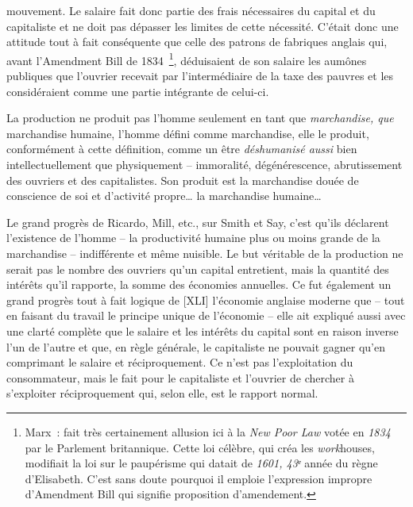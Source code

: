 \documentclass[french,twoside]{book} %
\begin{document}
mouvement. Le salaire fait donc partie des frais nécessaires du capital et du capitaliste et ne doit pas dépasser les limites de cette nécessité. C’était donc une attitude tout à fait conséquente que celle des patrons de fabriques anglais qui, avant l’Amendment Bill de 1834 \footnote{Marx : fait très certainement allusion ici à la \emph{New Poor Law} votée en \emph{1834} par le Parlement britannique. Cette loi célèbre, qui créa les \emph{work}houses, modifiait la loi sur le paupérisme qui datait de \emph{1601, 43ᵉ} année du règne d’Elisabeth. C’est sans doute pourquoi il emploie l’expression impropre d’Amendment Bill qui signifie proposition d’amendement.}, déduisaient de son salaire les aumônes publiques que l’ouvrier recevait par l’intermédiaire de la taxe des pauvres et les considéraient comme une partie intégrante de celui-ci.\par
La production ne produit pas l’homme seulement en tant que \emph{marchandise, que} marchandise humaine, l’homme défini comme marchandise, elle le produit, conformément à cette définition, comme un être \emph{déshumanisé aussi} bien intellectuellement que physiquement – immoralité, dégénérescence, abrutissement des ouvriers et des capitalistes. Son produit est la marchandise douée de conscience de soi et d’activité propre… la marchandise humaine…\par
Le grand progrès de Ricardo, Mill, etc., sur Smith et Say, c’est qu’ils déclarent l’existence de l’homme – la productivité humaine plus ou moins grande de la marchandise – indifférente et même nuisible. Le but véritable de la production ne serait pas le nombre des ouvriers qu’un capital entretient, mais la quantité des intérêts qu’il rapporte, la somme des économies annuelles. Ce fut également un grand progrès tout à fait logique de [XLI] l’économie anglaise moderne que – tout en faisant du travail le principe unique de l’économie – elle ait expliqué aussi avec une clarté complète que le salaire et les intérêts du capital sont en raison inverse l’un de l’autre et que, en règle générale, le capitaliste ne pouvait gagner qu’en comprimant le salaire et réciproquement. Ce n’est pas l’exploitation du consommateur, mais le fait pour le capitaliste et l’ouvrier de chercher à s’exploiter réciproquement qui, selon elle, est le rapport normal.\par
\end{document}
